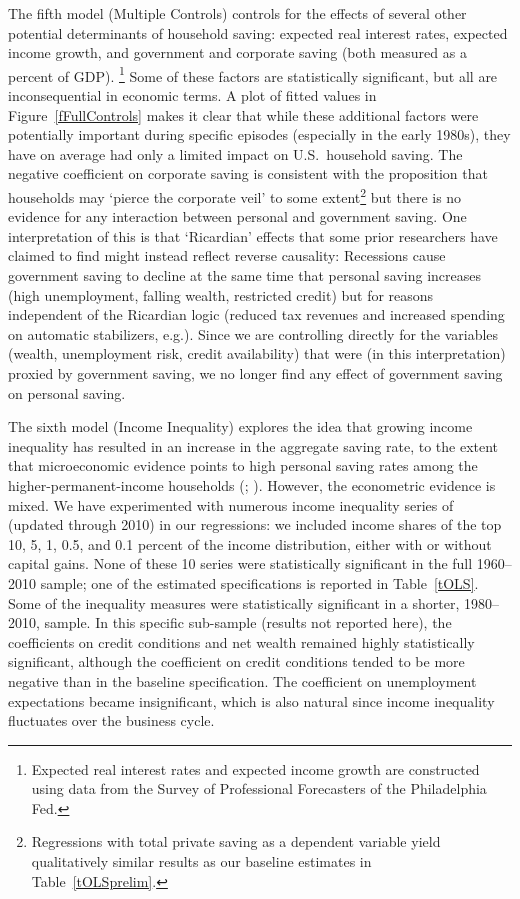 \documentclass[titlepage]{\econtex}
\begin{document}
The fifth model (Multiple Controls) controls for the effects of several other potential determinants of
household saving: expected real interest rates, expected income
growth, and government and corporate saving (both measured as a
percent of GDP).%
\footnote{  Expected real interest rates and expected income growth are
  constructed using data from the Survey of Professional Forecasters
  of the Philadelphia Fed.} Some of these factors are statistically
significant, but all are inconsequential in economic
terms. A plot of fitted values in Figure~\ref{fFullControls} makes it clear that while these
additional factors were potentially important during specific episodes
(especially in the early 1980s), they have on average had only a
limited impact on U.S.\ household saving. The negative coefficient on
corporate saving is consistent with the proposition that households
may `pierce the corporate veil' to some
extent\footnote{Regressions with total private saving as a dependent
  variable yield qualitatively similar results as our baseline
  estimates in Table~\ref{tOLSprelim}.  } but there is no evidence for
any interaction between personal and government saving.  One
interpretation of this is that `Ricardian' effects that some prior
researchers have claimed to find might instead reflect reverse
causality: Recessions cause government saving to decline at the same
time that personal saving increases (high unemployment, falling
wealth, restricted credit) but for reasons independent of the Ricardian
logic (reduced tax revenues and increased spending on automatic
stabilizers, e.g.).  Since we are controlling directly for the variables
(wealth, unemployment risk, credit availability) that were (in this
interpretation) proxied by government saving, we no longer find any effect
of government saving on personal saving.

The sixth model (Income Inequality) explores the idea that growing income inequality
 has resulted in an increase in the aggregate saving rate, to the extent that microeconomic evidence
 points to high personal saving rates among the higher-permanent-income households
 (\cite{carroll:richsave}; \cite{dszRichSave}). However, the econometric evidence is mixed.
 We have experimented with numerous income inequality series of \cite{Piketty_Saez2003} (updated through 2010)
 in our regressions: we included income shares of the top 10, 5, 1, 0.5, and 0.1 percent of the income distribution,
 either with or without capital gains. None of these 10 series were statistically significant in the full 1960--2010
 sample; one of the estimated specifications is reported in Table~\ref{tOLS}. Some of the inequality measures
 were statistically significant in a shorter, 1980--2010, sample. In this specific sub-sample (results not reported here),
 the coefficients on credit conditions and net wealth remained highly statistically significant, although the coefficient
 on credit conditions tended to be more negative than in the baseline specification. The coefficient on unemployment expectations
 became insignificant, which is also natural since income inequality fluctuates over the business cycle.
\end{document}
